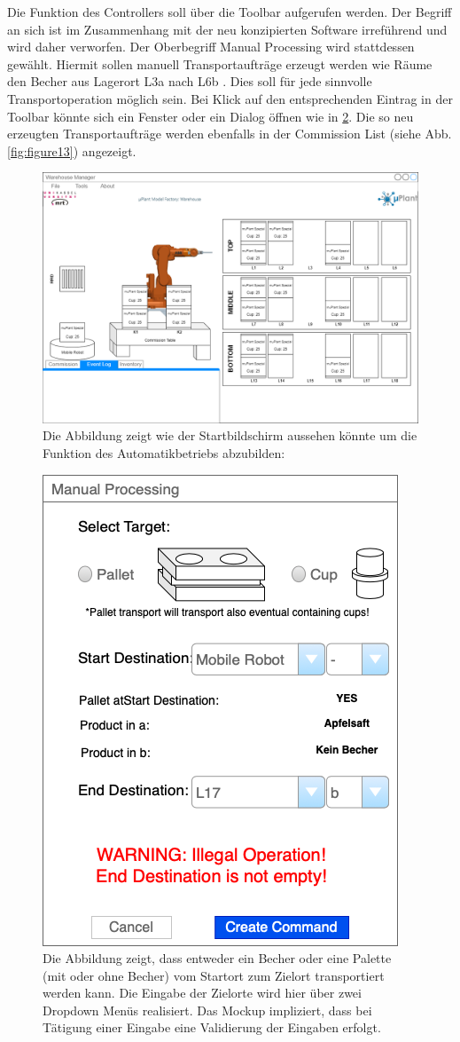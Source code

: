 Die Funktion des Controllers soll über die Toolbar aufgerufen werden.
Der Begriff an sich ist im Zusammenhang mit der neu konzipierten Software irreführend und wird daher verworfen.
Der Oberbegriff \glqq Manual Processing \grqq wird stattdessen gewählt.
Hiermit sollen manuell Transportaufträge erzeugt werden wie \glqq Räume den Becher aus Lagerort L3a nach L6b \grqq.
Dies soll für jede sinnvolle Transportoperation möglich sein.
Bei Klick auf den entsprechenden Eintrag in der Toolbar könnte sich ein Fenster oder ein Dialog öffnen wie in
\ref{fig:figure12}.
Die so neu erzeugten Transportaufträge werden ebenfalls in der Commission List (siehe Abb. \ref{fig:figure13}) angezeigt.\\

\begin{figure}
        \caption[Mockup des Startbildschirms]
        {\small Die Abbildung zeigt wie der Startbildschirm aussehen könnte um die Funktion des Automatikbetriebs abzubilden:
        }\label{fig:figure11}
        \includegraphics[width = \textwidth ]{Bilder/Mockup_Startbildschirm}
        \centering
\end{figure}

\begin{figure}
        \caption[Mockup des Menüs für die manuelle Lagersteuerung]
        {\small Die Abbildung zeigt, dass entweder ein Becher oder eine Palette (mit oder ohne Becher) vom Startort zum
        Zielort transportiert werden kann. Die Eingabe der Zielorte wird hier über zwei Dropdown Menüs realisiert.
        Das Mockup impliziert, dass bei Tätigung einer Eingabe eine Validierung der Eingaben erfolgt.
        }\label{fig:figure12}
        \includegraphics[height = 0.5\textwidth ]{Bilder/Mockup_ManualProcessing}
        \centering
\end{figure}


